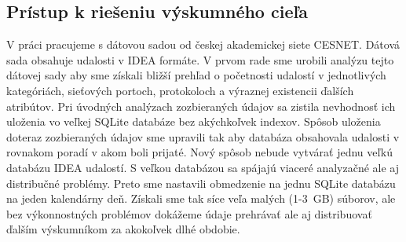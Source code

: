 \documentclass[thesismargins, thesislinespacing, openright, upjsfrontpage, combineabstracts]{rnthesis}
\begin{document}

\subsection{Prístup k riešeniu výskumného cieľa} \label{c1_metodologia}

V práci pracujeme s dátovou sadou od českej akademickej siete CESNET. Dátová sada obsahuje udalosti v IDEA formáte. V prvom rade sme urobili analýzu tejto dátovej sady aby sme získali bližší prehľad o početnosti udalostí v jednotlivých kategóriách, sieťových portoch, protokoloch a výraznej existencii ďalších atribútov. Pri úvodných analýzach zozbieraných údajov sa zistila nevhodnosť ich uloženia vo veľkej SQLite databáze bez akýchkoľvek indexov. Spôsob uloženia doteraz zozbieraných údajov sme upravili tak aby databáza obsahovala udalosti v rovnakom poradí v akom boli prijaté. Nový spôsob nebude vytvárať jednu veľkú databázu IDEA udalostí. S veľkou databázou sa spájajú viaceré analyzačné ale aj distribučné problémy. Preto sme nastavili obmedzenie na jednu SQLite databázu na jeden kalendárny deň. Získali sme tak síce veľa malých (1-3~GB) súborov, ale bez výkonnostných problémov dokážeme údaje prehrávať ale aj distribuovať ďalším výskumníkom za akokoľvek dlhé obdobie. 
\end{document}
